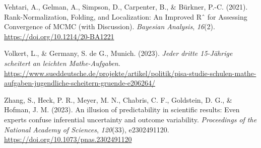\documentclass[
  jou,
  floatsintext,
  longtable,
  nolmodern,
  notxfonts,
  notimes,
  colorlinks=true,linkcolor=blue,citecolor=blue,urlcolor=blue]{apa7}
\newlength{\cslhangindent}
\newenvironment{CSLReferences}[2] %
 {\begin{list}{}{%
  \setlength{\itemindent}{0pt}
  \setlength{\leftmargin}{0pt}
  \setlength{\parsep}{0pt}
  \ifodd #1
   \setlength{\leftmargin}{\cslhangindent}
   \setlength{\itemindent}{-1\cslhangindent}
  \fi
  \setlength{\itemsep}{#2\baselineskip}}}
 {\end{list}}
\begin{document}
\begin{CSLReferences}{1}{0}
Vehtari, A., Gelman, A., Simpson, D., Carpenter, B., \& Bürkner, P.-C.
(2021). Rank-Normalization, Folding, and Localization: An Improved Rˆ
for Assessing Convergence of MCMC (with Discussion). \emph{Bayesian
Analysis}, \emph{16}(2). \url{https://doi.org/10.1214/20-BA1221}

Volkert, L., \& Germany, S. de G., Munich. (2023). \emph{Jeder dritte
15-Jährige scheitert an leichten Mathe-Aufgaben}.
\url{https://www.sueddeutsche.de/projekte/artikel/politik/pisa-studie-schulen-mathe-aufgaben-jugendliche-scheitern-gruende-e206264/}

Zhang, S., Heck, P. R., Meyer, M. N., Chabris, C. F., Goldstein, D. G.,
\& Hofman, J. M. (2023). An illusion of predictability in scientific
results: Even experts confuse inferential uncertainty and outcome
variability. \emph{Proceedings of the National Academy of Sciences},
\emph{120}(33), e2302491120.
\url{https://doi.org/10.1073/pnas.2302491120}

\end{CSLReferences}
\end{document}
